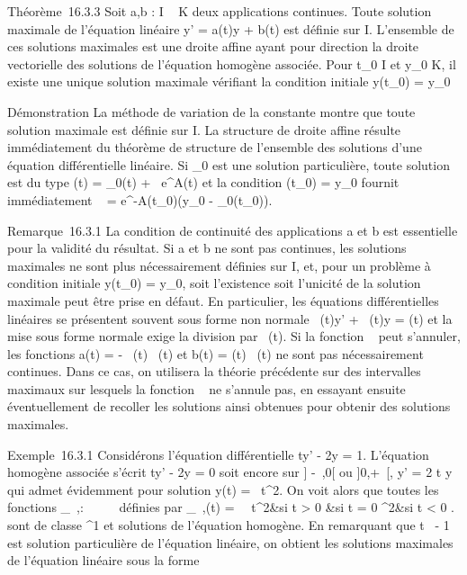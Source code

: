 Théorème~16.3.3 Soit a,b : I \rightarrow~ K deux applications continues. Toute
solution maximale de l'équation linéaire y' = a(t)y + b(t) est définie
sur I. L'ensemble de ces solutions maximales est une droite affine ayant
pour direction la droite vectorielle des solutions de l'équation
homogène associée. Pour t_0 \in I et y_0 \in K, il existe
une unique solution maximale vérifiant la condition initiale
y(t_0) = y_0

Démonstration La méthode de variation de la constante montre que toute
solution maximale est définie sur I. La structure de droite affine
résulte immédiatement du théorème de structure de l'ensemble des
solutions d'une équation différentielle linéaire. Si \phi_0 est
une solution particulière, toute solution est du type \phi(t) =
\phi_0(t) + \lambda~e^A(t) et la condition \phi(t_0) =
y_0 fournit immédiatement \lambda~ =
e^-A(t_0)(y_0 -
\phi_0(t_0)).

Remarque~16.3.1 La condition de continuité des applications a et b est
essentielle pour la validité du résultat. Si a et b ne sont pas
continues, les solutions maximales ne sont plus nécessairement définies
sur I, et, pour un problème à condition initiale y(t_0) =
y_0, soit l'existence soit l'unicité de la solution maximale
peut être prise en défaut. En particulier, les équations différentielles
linéaires se présentent souvent sous forme non normale \alpha~(t)y' + \beta~(t)y =
\gamma(t) et la mise sous forme normale exige la division par \alpha~(t). Si la
fonction \alpha~ peut s'annuler, les fonctions a(t) = - \beta~(t)
\over \alpha~(t) et b(t) = \gamma(t) \over \alpha~(t)
ne sont pas nécessairement continues. Dans ce cas, on utilisera la
théorie précédente sur des intervalles maximaux sur lesquels la fonction
\alpha~ ne s'annule pas, en essayant ensuite éventuellement de recoller les
solutions ainsi obtenues pour obtenir des solutions maximales.

Exemple~16.3.1 Considérons l'équation différentielle ty' - 2y = 1.
L'équation homogène associée s'écrit ty' - 2y = 0 soit encore sur ]
-\infty~,0[ ou ]0,+\infty~[, y' = 2 \over t y qui admet
évidemment pour solution y(t) = \lambda~t^2. On voit alors que
toutes les fonctions \phi_\lambda~,\mu : ~ \rightarrow~ ~ définies par
\phi_\lambda~,\mu(t) = \left \
\cases \lambda~t^2&si t > 0
 &si t = 0 \cr \mut^2&si t
< 0  \right . sont de classe ^1
et solutions de l'équation homogène. En remarquant que
t\mapsto~ - 1  est
solution particulière de l'équation linéaire, on obtient les solutions
maximales de l'équation linéaire sous la forme

